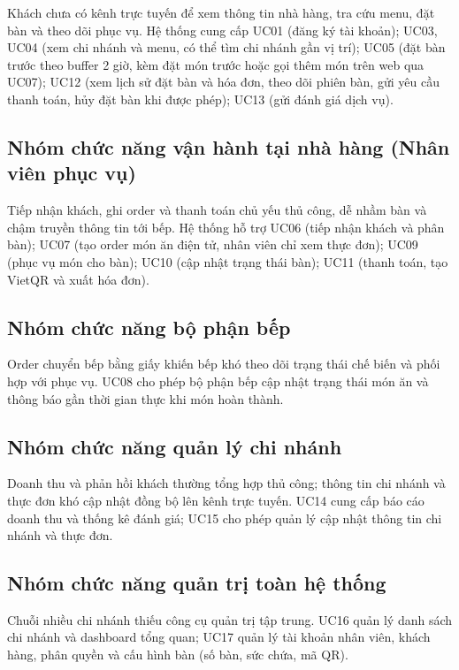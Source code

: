 ﻿\documentclass[../DoAn.tex]{subfiles}
\begin{document}
Khách chưa có kênh trực tuyến để xem thông tin nhà hàng, tra cứu menu, đặt bàn và theo dõi phục vụ. Hệ thống cung cấp UC01 (đăng ký tài khoản); UC03, UC04 (xem chi nhánh và menu, có thể tìm chi nhánh gần vị trí); UC05 (đặt bàn trước theo buffer 2 giờ, kèm đặt món trước hoặc gọi thêm món trên web qua UC07); UC12 (xem lịch sử đặt bàn và hóa đơn, theo dõi phiên bàn, gửi yêu cầu thanh toán, hủy đặt bàn khi được phép); UC13 (gửi đánh giá dịch vụ).

\subsection{Nhóm chức năng vận hành tại nhà hàng (Nhân viên phục vụ)}

Tiếp nhận khách, ghi order và thanh toán chủ yếu thủ công, dễ nhầm bàn và chậm truyền thông tin tới bếp. Hệ thống hỗ trợ UC06 (tiếp nhận khách và phân bàn); UC07 (tạo order món ăn điện tử, nhân viên chỉ xem thực đơn); UC09 (phục vụ món cho bàn); UC10 (cập nhật trạng thái bàn); UC11 (thanh toán, tạo VietQR và xuất hóa đơn).

\subsection{Nhóm chức năng bộ phận bếp}

Order chuyển bếp bằng giấy khiến bếp khó theo dõi trạng thái chế biến và phối hợp với phục vụ. UC08 cho phép bộ phận bếp cập nhật trạng thái món ăn và thông báo gần thời gian thực khi món hoàn thành.

\subsection{Nhóm chức năng quản lý chi nhánh}

Doanh thu và phản hồi khách thường tổng hợp thủ công; thông tin chi nhánh và thực đơn khó cập nhật đồng bộ lên kênh trực tuyến. UC14 cung cấp báo cáo doanh thu và thống kê đánh giá; UC15 cho phép quản lý cập nhật thông tin chi nhánh và thực đơn.

\subsection{Nhóm chức năng quản trị toàn hệ thống}

Chuỗi nhiều chi nhánh thiếu công cụ quản trị tập trung. UC16 quản lý danh sách chi nhánh và dashboard tổng quan; UC17 quản lý tài khoản nhân viên, khách hàng, phân quyền và cấu hình bàn (số bàn, sức chứa, mã QR).
\end{document}
